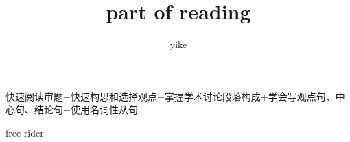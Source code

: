 \documentclass[a4paper, 10pt]{article}
\begin{document}
\title{{ \textbf {part of reading}}}
  \author{yike}
  \date{}
  
  \maketitle

快速阅读审题+快速构思和选择观点+掌握学术讨论段落构成+学会写观点句、中心句、结论句+使用名词性从句

free rider
\end{document}
